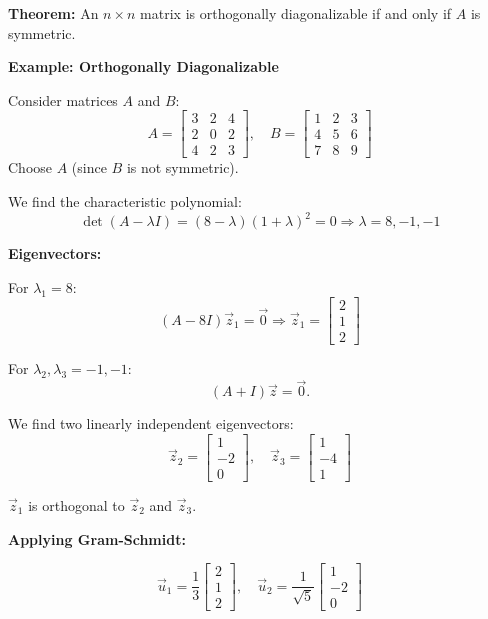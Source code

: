 \documentclass{article}
\begin{document}
\textbf{Theorem:} An $n \times n$ matrix is orthogonally diagonalizable if and only if $A$ is symmetric.

\textbf{Example: Orthogonally Diagonalizable}

Consider matrices $A$ and $B$:
\[
A = \begin{bmatrix}
3 & 2 & 4 \\
2 & 0 & 2 \\
4 & 2 & 3
\end{bmatrix}, \quad
B = \begin{bmatrix}
1 & 2 & 3 \\
4 & 5 & 6 \\
7 & 8 & 9
\end{bmatrix}
\]
Choose $A$ (since $B$ is not symmetric).

We find the characteristic polynomial:
\[
\det(A - \lambda I) = (8-\lambda)(1+\lambda)^2 = 0 \Rightarrow \lambda = 8, -1, -1
\]

\textbf{Eigenvectors:}

For $\lambda_1 = 8$:
\[
(A - 8I)\vec{z}_1 = \vec{0} \Rightarrow \vec{z}_1 = \begin{bmatrix} 2 \\ 1 \\ 2 \end{bmatrix}
\]

For $\lambda_2, \lambda_3 = -1, -1$:
\[
(A + I)\vec{z} = \vec{0}.
\]

We find two linearly independent eigenvectors:
\[
\vec{z}_2 = \begin{bmatrix} 1 \\ -2 \\ 0 \end{bmatrix}, \quad
\vec{z}_3 = \begin{bmatrix} 1 \\ -4 \\ 1 \end{bmatrix}
\]

$\vec{z}_1$ is orthogonal to $\vec{z}_2$ and $\vec{z}_3$.

\textbf{Applying Gram-Schmidt:}

\[
\vec{u}_1 = \frac{1}{3} \begin{bmatrix} 2 \\ 1 \\ 2 \end{bmatrix}, \quad
\vec{u}_2 = \frac{1}{\sqrt{5}} \begin{bmatrix} 1 \\ -2 \\ 0 \end{bmatrix}
\]
\end{document}
